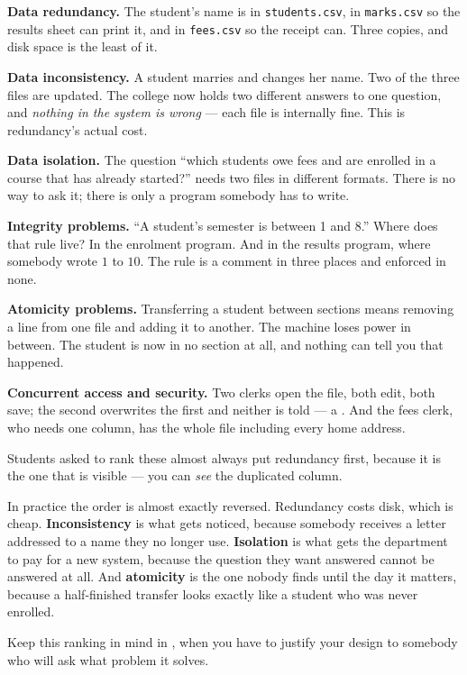 \begin{alertbox}
\begin{tightnum}
  \item \textbf{Data redundancy.} The student's name is in
        \texttt{students.csv}, in \texttt{marks.csv} so the results sheet can
        print it, and in \texttt{fees.csv} so the receipt can. Three copies,
        and disk space is the least of it.
  \item \textbf{Data inconsistency.} A student marries and changes her name.
        Two of the three files are updated. The college now holds two different
        answers to one question, and \emph{nothing in the system is wrong} ---
        each file is internally fine. This is redundancy's actual cost.
  \item \textbf{Data isolation.} The question ``which students owe fees and
        are enrolled in a course that has already started?'' needs two files in
        different formats. There is no way to ask it; there is only a program
        somebody has to write.
  \item \textbf{Integrity problems.} ``A student's semester is between 1 and
        8.'' Where does that rule live? In the enrolment program. And in the
        results program, where somebody wrote $1$ to $10$. The rule is a
        comment in three places and enforced in none.
  \item \textbf{Atomicity problems.} Transferring a student between sections
        means removing a line from one file and adding it to another. The
        machine loses power in between. The student is now in no section at
        all, and nothing can tell you that happened.
  \item \textbf{Concurrent access and security.} Two clerks open the file, both
        edit, both save; the second overwrites the first and neither is told
        --- a . And the fees clerk, who needs one column, has
        the whole file including every home address.
\end{tightnum}
\end{alertbox}

\begin{conceptbox}
Students asked to rank these almost always put redundancy first, because it is
the one that is visible --- you can \emph{see} the duplicated column.

\smallskip
In practice the order is almost exactly reversed. Redundancy costs disk, which
is cheap. \textbf{Inconsistency} is what gets noticed, because somebody
receives a letter addressed to a name they no longer use. \textbf{Isolation}
is what gets the department to pay for a new system, because the question they
want answered cannot be answered at all. And \textbf{atomicity} is the one
nobody finds until the day it matters, because a half-finished transfer looks
exactly like a student who was never enrolled.

\smallskip
Keep this ranking in mind in , when you have to justify your
design to somebody who will ask what problem it solves.
\end{conceptbox}

